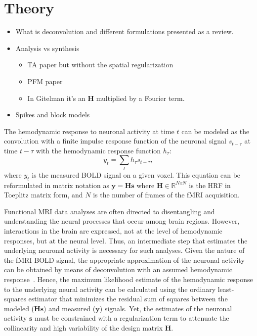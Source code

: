 \section{Theory}

\begin{itemize}
    \item What is deconvolution and different formulations presented as a review.
    \item Analysis vs synthesis
    \begin{itemize}
        \item TA paper but without the spatial regularization
        \item PFM paper
        \item In Gitelman it's an \(\mathbf{H}\) multiplied by a Fourier term.
    \end{itemize}
    \item Spikes and block models
\end{itemize}

The hemodynamic response to neuronal activity at time \(t\) can be modeled as the convolution with a finite impulse response function of the neuronal signal \(s_{t-\tau}\) at time \(t-\tau\) with the hemodynamic response function \(h_{\tau}\):
\begin{equation}
    \label{eq:gitelman}
    y_t = \sum_t h_{\tau} s_{t-\tau},
\end{equation}
where \(y_t\) is the measured BOLD signal on a given voxel. This equation can be reformulated in matrix notation as \(\mathbf{y} = \mathbf{Hs}\) where \(\mathbf{H} \in \mathbb{R}^{NxN}\) is the HRF in Toeplitz matrix form, and \(N\) is the number of frames of the fMRI acquisition.

Functional MRI data analyses are often directed to disentangling and understanding the neural processes that occur among brain regions. However, interactions in the brain are expressed, not at the level of hemodynamic responses, but at the neural level. Thus, an intermediate step that estimates the underlying neuronal activity is necessary for such analyses. Given the nature of the fMRI BOLD signal, the appropriate approximation of the neuronal activity can be obtained by means of deconvolution with an assumed hemodynamic response~\cite{gitelman2003modeling}. Hence, the maximum likelihood estimate of the hemodynamic response to the underlying neural activity can be calculated using the ordinary least-squares estimator that minimizes the residual sum of squares between the modeled (\(\mathbf{Hs}\)) and measured (\(\mathbf{y}\)) signals. Yet, the estimates of the neuronal activity \(\mathbf{s}\) must be constrained with a regularization term to attenuate the collinearity and high variability of the design matrix \(\mathbf{H}\).

